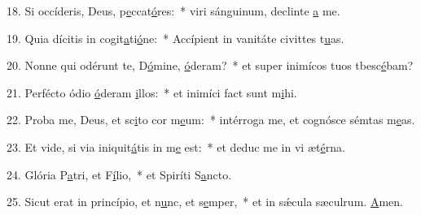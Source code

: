 18. Si occíderis, Deus, p\uline{e}ccat\uline{ó}res:~* viri sánguinum, declinte \uline{a} me.\par 
19. Quia dícitis in cogit\uline{a}ti\uline{ó}ne:~* Accípient in vanitáte civittes t\uline{u}as.\par 
20. Nonne qui odérunt te, D\uline{ó}mine, \uline{ó}deram?~* et super inimícos tuos tbesc\uline{é}bam?\par 
21. Perfécto ódio \uline{ó}deram \uline{i}llos:~* et inimíci fact sunt m\uline{i}hi.\par 
22. Proba me, Deus, et sc\uline{i}to cor m\uline{e}um:~* intérroga me, et cognósce sémtas m\uline{e}as.\par 
23. Et vide, si via iniquit\uline{á}tis in m\uline{e} est:~* et deduc me in vi æt\uline{é}rna.\par 
24. Glória P\uline{a}tri, et F\uline{í}lio,~* et Spiríti S\uline{a}ncto.\par 
25. Sicut erat in princípio, et n\uline{u}nc, et s\uline{e}mper,~* et in sǽcula sæculrum. \uline{A}men.\par 
